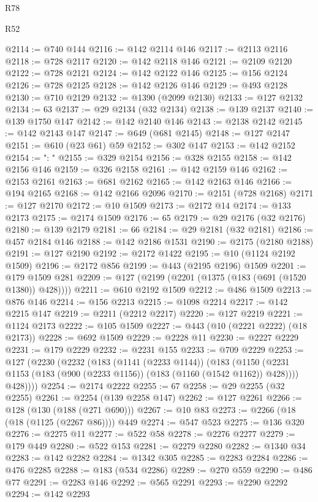 \begin{lexlean}{R78}
\begin{lexlean}{R52}
\begin{coremodule}
{{{{{{{{{{{{{{{{{{{{{{{{{{{{{{{{{{{{{{{{{{{{{{{{{{{{{{{{{{{{{{{{{{{{{{{{{{{{{{{{{{{{{{{{{{{{{{{{{{{{{{{{{{{{{{{{{{{{{{{{{{{{{{{{{{{{{{{{{{{{{{{{{{{{{{{{{{{{{{{{{{{{{{{{{{{{{{{{{{{{{{{{{{{{{{{{{{{{{{@2114 := @740 @144
@2116 := @142 @2114 @146
@2117 := @2113 @2116
@2118 := @728 @2117
@2120 := @142 @2118 @146
@2121 := @2109 @2120
@2122 := @728 @2121
@2124 := @142 @2122 @146
@2125 := @156 @2124
@2126 := @728 @2125
@2128 := @142 @2126 @146
@2129 := @493 @2128
@2130 := @710 @2129
@2132 := @1390 (@2099 @2130)
@2133 := @127 @2132
@2134 := 63
@2137 := @29 @2134 (@32 @2134)
@2138 := @139 @2137
@2140 := @139 @1750 @147
@2142 := @142 @2140 @146
@2143 := @2138 @2142
@2145 := @142 @2143 @147
@2147 := @649 (@681 @2145)
@2148 := @127 @2147
@2151 := @610 (@23 @61) @59
@2152 := @302 @147
@2153 := @142 @2152
@2154 := ": "
@2155 := @329 @2154
@2156 := @328 @2155
@2158 := @142 @2156 @146
@2159 := @326 @2158
@2161 := @142 @2159 @146
@2162 := @2153 @2161
@2163 := @681 @2162
@2165 := @142 @2163 @146
@2166 := @194 @2165
@2168 := @142 @2166 @2096
@2170 := @2151 (@728 @2168)
@2171 := @127 @2170
@2172 := @10 @1509
@2173 := @2172 @14
@2174 := @133 @2173
@2175 := @2174 @1509
@2176 := 65
@2179 := @29 @2176 (@32 @2176)
@2180 := @139 @2179
@2181 := 66
@2184 := @29 @2181 (@32 @2181)
@2186 := @457 @2184 @146
@2188 := @142 @2186 @1531
@2190 := @2175 (@2180 @2188)
@2191 := @127 @2190
@2192 := @2172 @1422
@2195 := @10 (@1124 @2192 @1509)
@2196 := @2172 @856
@2199 := @443 (@2195 @2196) @1509
@2201 := @179 @1509 @281
@2209 := @127 (@2199 (@2201 (@1375 (@183 (@691 (@1520 @1380)) @428))))
@2211 := @610 @2192 @1509
@2212 := @486 @1509
@2213 := @876 @146
@2214 := @156 @2213
@2215 := @1098 @2214
@2217 := @142 @2215 @147
@2219 := @2211 (@2212 @2217)
@2220 := @127 @2219
@2221 := @1124 @2173
@2222 := @105 @1509
@2227 := @443 (@10 (@2221 @2222) (@18 @2173))
@2228 := @692 @1509
@2229 := @2228 @11
@2230 := @2227 @2229
@2231 := @179 @2229
@2232 := @2231 @155
@2233 := @709 @2229
@2253 := @127
    (@2230
      (@2232
        (@183
          (@1141 (@2233 @1144))
          (@183
            (@1150 (@2231 @1153 (@183 (@900 (@2233 @1156)) (@183 (@1160 (@1542 @1162)) @428))))
            @428))))
@2254 := @2174 @2222
@2255 := 67
@2258 := @29 @2255 (@32 @2255)
@2261 := @2254 (@139 @2258 @147)
@2262 := @127 @2261
@2266 := @128 (@130 (@188 (@271 @690)))
@2267 := @10 @83
@2273 := @2266 (@18 (@18 (@1125 (@2267 @86)))) @449
@2274 := @547 @523
@2275 := @136 @320
@2276 := @2275 @11
@2277 := @522 @58
@2278 := @2276 @2277
@2279 := @179 @449
@2280 := @522 @153
@2281 := @2279 @2280
@2282 := @1340 @34
@2283 := @142 @2282
@2284 := @1342 @305
@2285 := @2283 @2284
@2286 := @476 @2285
@2288 := @183 (@534 @2286)
@2289 := @270 @559
@2290 := @486 @77
@2291 := @2283 @146
@2292 := @565 @2291
@2293 := @2290 @2292
@2294 := @142 @2293
}}}}}}}}}}}}}}}}}}}}}}}}}}}}}}}}}}}}}}}}}}}}}}}}}}}}}}}}}}}}}}}}}}}}}}}}}}}}}}}}}}}}}}}}}}}}}}}}}}}}}}}}}}}}}}}}}}}}}}}}}}}}}}}}}}}}}}}}}}}}}}}}}}}}}}}}}}}}}}}}}}}}}}}}}}}}}}}}}}}}}}}}}}}}}}}}}}}}}}
\end{coremodule}
\end{lexlean}
\end{lexlean}
